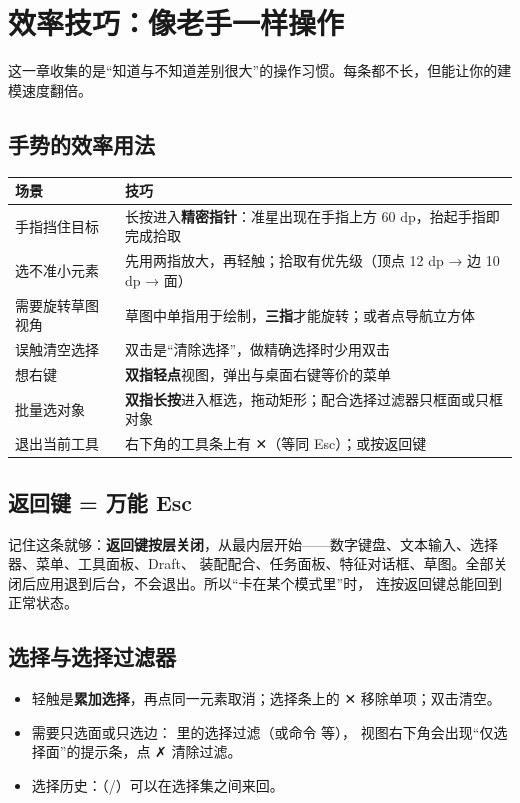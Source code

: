\chapter{效率技巧：像老手一样操作}

这一章收集的是“知道与不知道差别很大”的操作习惯。每条都不长，但能让你的建模速度翻倍。

\section{手势的效率用法}

\begin{center}
\small
\begin{tabularx}{\linewidth}{@{}lX@{}}
\toprule
\textbf{场景} & \textbf{技巧} \\
\midrule
手指挡住目标 & 长按进入\textbf{精密指针}：准星出现在手指上方 60 dp，抬起手指即完成拾取 \\
选不准小元素 & 先用两指放大，再轻触；拾取有优先级（顶点 12 dp → 边 10 dp → 面） \\
需要旋转草图视角 & 草图中单指用于绘制，\textbf{三指}才能旋转；或者点导航立方体 \\
误触清空选择 & 双击是“清除选择”，做精确选择时少用双击 \\
想右键 & \textbf{双指轻点}视图，弹出与桌面右键等价的菜单 \\
批量选对象 & \textbf{双指长按}进入框选，拖动矩形；配合选择过滤器只框面或只框对象 \\
退出当前工具 & 右下角的工具条上有 ✕（等同 Esc）；或按返回键 \\
\bottomrule
\end{tabularx}
\end{center}

\section{返回键 = 万能 Esc}

记住这条就够：\textbf{返回键按层关闭}，从最内层开始——数字键盘、文本输入、选择器、菜单、工具面板、Draft、
装配配合、任务面板、特征对话框、草图。全部关闭后应用退到后台，不会退出。所以“卡在某个模式里”时，
连按返回键总能回到正常状态。

\section{选择与选择过滤器}

\begin{itemize}
  \item 轻触是\textbf{累加选择}，再点同一元素取消；选择条上的 ✕ 移除单项；双击清空。
  \item 需要只选面或只选边： 里的选择过滤（或命令  等），
        视图右下角会出现“仅选择面”的提示条，点 ✗ 清除过滤。
  \item 选择历史：（/）可以在选择集之间来回。
\end{itemize}

